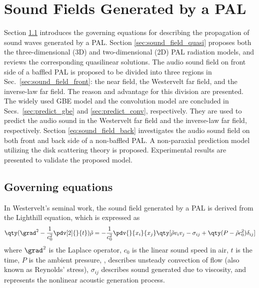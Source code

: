\chapter{Sound Fields Generated by a PAL} %
\label{chap:sound_field} %

\noindent Section \ref{sec:sound_field_governing_equations} introduces the governing equations for describing the propagation of sound waves generated by a PAL.
Section \ref{sec:sound_field_quasi} proposes both the three-dimensional (3D) and two-dimensional (2D) PAL radiation models, and reviews the corresponding quasilinear solutions.
The audio sound field on front side of a baffled PAL is proposed to be divided into three regions in Sec.~\ref{sec:sound_field_front}: the near field, the Westervelt far field, and the inverse-law far field.
The reason and advantage for this division are presented.
The widely used GBE model and the convolution model are concluded in Secs.~\ref{sec:predict_gbe} and \ref{sec:predict_conv}, respectively. 
They are used to predict the audio sound in the Westervelt far field and the inverse-law far field, respectively.
Section \ref{eq:sound_field_back} investigates the audio sound field on both front and back side of a non-baffled PAL.
A non-paraxial prediction model utilizing the disk scattering theory is proposed.
Experimental results are presented to validate the proposed model.

\section{Governing equations}
\label{sec:sound_field_governing_equations}
In Westervelt's seminal work, the sound field generated by a PAL is derived from the Lighthill equation, which is expressed as \cite{Lighthill1952SoundGeneratedAerodynamically, Westervelt1963ParametricAcousticArray}
\begin{equation}
    \qty(\grad^2 - \frac{1}{c_0^2}\pdv[2]{}{t}) \tilde{\rho}
    = - \frac{1}{c_0^2}
    \pdv{}{x_i}{x_j}
    \qty[\tilde{\rho} v_i v_j - \sigma_{ij} + \qty(P-\tilde{\rho} c_0^2) \delta_{ij}]
    \label{eq:chap3:1289dfew}
\end{equation}
where $\grad^2$ is the Laplace operator, $c_0$ is the linear sound speed in air, $t$ is the time, $P$ is the ambient pressure, ,  describes unsteady convection of flow (also known as Reynolds' stress), $\sigma_{ij}$ describes sound generated due to viscosity, and  represents the nonlinear acoustic generation process. 

